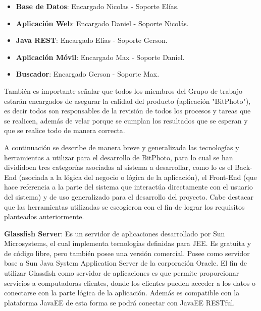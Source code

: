 \documentclass{memoria}
\begin{document}
\begin{itemize}
	\item \textbf{Base de Datos}: Encargado Nicolas - Soporte Elías.
	\item \textbf{Aplicación Web}: Encargado Daniel - Soporte Nicolás.
	\item \textbf{Java REST}: Encargado Elías - Soporte Gerson.
	\item \textbf{Aplicación Móvil}: Encargado Max - Soporte Daniel.
	\item \textbf{Buscador}: Encargado Gerson - Soporte Max.
\end{itemize}

También es importante señalar que todos los miembros del Grupo de trabajo estarán encargados de asegurar la calidad del producto (aplicación "BitPhoto"), es decir todos son responsables de la revisión de todos los procesos y tareas que se realicen, además de velar porque se cumplan los resultados que se esperan y que se realice todo de manera correcta.

\newpage


A continuación se describe de manera breve y generalizada las tecnologías y herramientas a utilizar para el desarrollo de BitPhoto, para lo cual se han divididoen tres categorías asociadas al sistema a desarrollar, como lo es el Back-End (asociada a la lógica del negocio o lógica de la aplicación), el Front-End (que hace referencia a la parte del sistema que interactúa directamente con el usuario del sistema) y de uso generalizado para el desarrollo del proyecto.  Cabe destacar que las herramientas utilizadas se escogieron con el fin de lograr los requisitos planteados anteriormente.\\


\textbf{Glassfish Server}: Es un servidor de aplicaciones desarrollado por Sun Microsystems, el cual implementa tecnologías definidas para JEE. Es gratuita y de código libre, pero también posee una versión comercial. Posee como servidor base a Sun Java System Application Server de la corporación Oracle. El fin de utilizar Glassfish como servidor de aplicaciones es que permite proporcionar servicios a computadoras clientes, donde los clientes pueden acceder a los datos o conectarse con la parte lógica de la aplicación. Además es compatible con la plataforma JavaEE de esta forma se podrá conectar con JavaEE RESTful.\\
\end{document}

